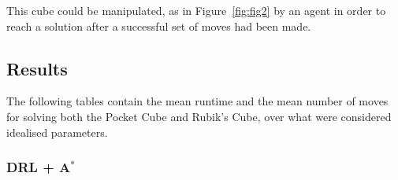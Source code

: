 \documentclass[UKenglish]{svproc}
\begin{document}
This cube could be manipulated, as in Figure~\ref{fig:fig2} by an agent in order to reach a solution after a successful set of moves had been made.

\subsection{Results}

The following tables contain the mean runtime and the mean number of moves for solving both the Pocket Cube and Rubik's Cube, over what were considered idealised parameters.

\vspace{8pt}
{\centering
{}

\vspace{8pt}
}

\vspace{8pt}
{\centering
{}

\vspace{8pt}
}



\subsubsection{DRL + A$^{\ast}$}
\end{document}
